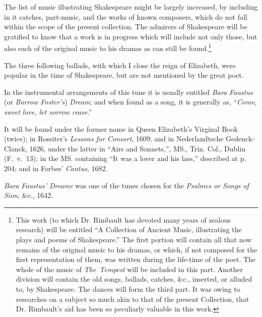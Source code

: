 

\begin{center}{\makebox[1in]{\hrulefill}}\end{center}

The list of music illustrating Shakespeare might be largely increased, by
including in it catches, part-music, and the works of known composers, which do
not fall within the scope of the present collection. The admirers of Shakespeare
will be gratified to know that a work is in progress which will include not only
those, but also such of the original music to his dramas as can still be found.\footnote{\textit{}
This work (to which Dr. Rimbault has devoted many
years of zealous research) will be entitled “A Collection
of Ancient Music, illustrating the plays and poems of
Shakespeare.” The first portion will contain all that now
remains of the original music to his dramas, or which, if
not composed for the first representation of them, was
written during the life-time of the poet. The whole of
the music of \textit{The~Tempest} will be included in this part.
Another division will contain the old songs, ballads,
catches, \&c., inserted, or alluded to, by Shakespeare. The
dances will form the third part. It was owing to researches
on a subject so much akin to that of the present
Collection, that Dr. Rimbault’s aid has been so peculiarly
valuable in this work.}

The three following ballads, with which I close the reign of Elizabeth, were
popular in the time of Shakespeare, \pagebreak but are not mentioned by the great poet.


In the instrumental arrangements of this tune it is usually entitled \textit{Bara
Faustus} (or \textit{Barrow Foster’s}) \textit{Dream}; and when found as a song, it is generally
as, “\textit{Come, sweet love, let sorrow cease}.”

It will be found under the former name in Queen Elizabeth’s Virginal Book
(twice); in Rossiter’s \textit{Lessons for Consort}, 1609; and in Nederlandtsche Gedenck-
Clanck, 1626, under the latter in “Airs and Sonnets,”, MS., Trin. Col., Dublin
(F.~v.~13); in the MS. containing “It was a lover and his lass,” described at
p. 204; and in Forbes’ \textit{Cantus}, 1682.

\textit{Bara Faustus’ Dreame} was one of the tunes chosen for the \textit{Psalmes or Songs
of Sion}, \&c., 1642.


